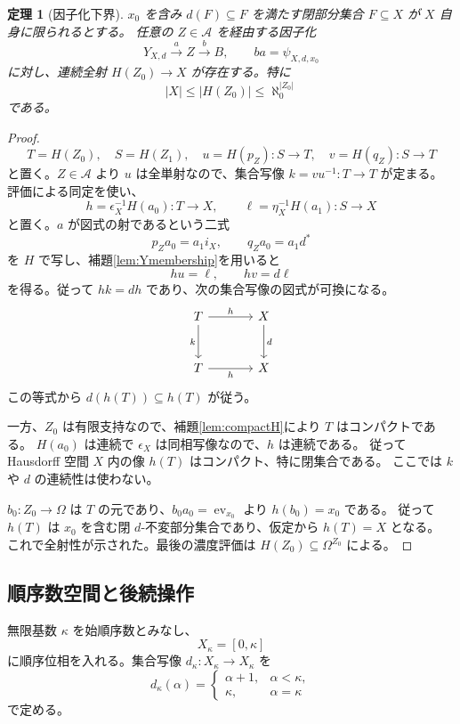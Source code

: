 \documentclass[a4paper,11pt]{ltjsarticle}
\theoremstyle{japaneseplain}
\newtheorem{theorem}{定理}[section]
\newcommand{\A}{\mathcal A}
\newcommand{\ev}{\operatorname{ev}}
\begin{document}
\begin{theorem}[因子化下界]\label{thm:bound}
$x_0$ を含み $d(F)\subseteq F$ を満たす閉部分集合 $F\subseteq X$ が
$X$ 自身に限られるとする。
任意の $Z\in\A$ を経由する因子化
\begin{equation}\label{eq:factorization}
 Y_{X,d}\xrightarrow{a}Z\xrightarrow{b}B,
 \qquad ba=\psi_{X,d,x_0}
\end{equation}
に対し、連続全射 $H(Z_0)\to X$ が存在する。特に
\begin{equation}\label{eq:bound}
 |X|\le |H(Z_0)|\le\aleph_0^{|Z_0|}
\end{equation}
である。
\end{theorem}
\begin{proof}
\[
 T=H(Z_0),\quad S=H(Z_1),\quad
 u=H(p_Z):S\to T,\quad v=H(q_Z):S\to T
\]
と置く。$Z\in\A$ より $u$ は全単射なので、集合写像 $k=vu^{-1}:T\to T$ が定まる。
評価による同定を使い、
\[
 h=\epsilon_X^{-1}H(a_0):T\to X,\qquad
 \ell=\eta_X^{-1}H(a_1):S\to X
\]
と置く。$a$ が図式の射であるという二式
\[
 p_Za_0=a_1i_X,\qquad q_Za_0=a_1d^*
\]
を $H$ で写し、補題\ref{lem:Ymembership}を用いると
\begin{equation}\label{eq:dualcommutation}
 hu=\ell,\qquad hv=d\ell
\end{equation}
を得る。従って $hk=dh$ であり、次の集合写像の図式が可換になる。
\[
 \begin{tikzcd}[column sep=large,row sep=large]
 T \arrow[r,"h"] \arrow[d,"k"'] & X \arrow[d,"d"]\\
 T \arrow[r,"h"'] & X
 \end{tikzcd}
\]
この等式から $d(h(T))\subseteq h(T)$ が従う。

一方、$Z_0$ は有限支持なので、補題\ref{lem:compactH}により $T$ はコンパクトである。
$H(a_0)$ は連続で $\epsilon_X$ は同相写像なので、$h$ は連続である。
従って Hausdorff 空間 $X$ 内の像 $h(T)$ はコンパクト、特に閉集合である。
ここでは $k$ や $d$ の連続性は使わない。

$b_0:Z_0\to\Omega$ は $T$ の元であり、$b_0a_0=\ev_{x_0}$ より $h(b_0)=x_0$ である。
従って $h(T)$ は $x_0$ を含む閉 $d$-不変部分集合であり、仮定から $h(T)=X$ となる。
これで全射性が示された。最後の濃度評価は $H(Z_0)\subseteq\Omega^{Z_0}$ による。
\end{proof}

\subsection{順序数空間と後続操作}

無限基数 $\kappa$ を始順序数とみなし、
\[
 X_\kappa=[0,\kappa]
\]
に順序位相を入れる。集合写像 $d_\kappa:X_\kappa\to X_\kappa$ を
\begin{equation}\label{eq:successor}
 d_\kappa(\alpha)=
 \begin{cases}
  \alpha+1,&\alpha<\kappa,\\
  \kappa,&\alpha=\kappa
 \end{cases}
\end{equation}
で定める。
\end{document}
